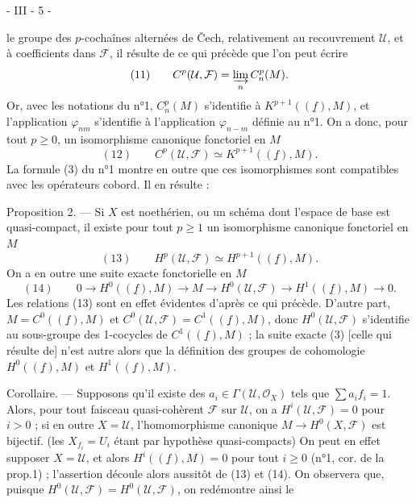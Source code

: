 \newpage


- III - 5 -

le groupe des $p$-cochaînes alternées de Čech, relativement au recouvrement $\mathcal{U}$, et à coefficients dans $\mathcal{F}$, il résulte de ce qui précède que l'on peut écrire
$$(11) \qquad C^p(\mathcal{U}, \mathcal{F}) = \varinjlim_n C_n^p(M) .$$
Or, avec les notations du n°1, $C_n^p(M)$ s'identifie à $K^{p+1}((\underline{f}), M)$, et l'application $\varphi_{nm}$ s'identifie à l'application $\varphi_{n-m}$ définie au n°1. On a donc, pour tout $p \ge 0$, un isomorphisme canonique fonctoriel en $M$
$$(12) \qquad C^p(\mathcal{U}, \mathcal{F}) \simeq K^{p+1}((\underline{f}), M) .$$
La formule (3) du n°1 montre en outre que ces isomorphismes sont compatibles avec les opérateurs cobord. Il en résulte :

Proposition 2. — Si $X$ est noethérien, ou un schéma dont l'espace de base est quasi-compact, il existe pour tout $p \ge 1$ un isomorphisme canonique fonctoriel en $M$
$$(13) \qquad H^p(\mathcal{U}, \mathcal{F}) \simeq H^{p+1}((\underline{f}), M) .$$
On a en outre une suite exacte fonctorielle en $M$
$$(14) \qquad 0 \to H^0((\underline{f}), M) \to M \to H^0(\mathcal{U}, \mathcal{F}) \to H^1((\underline{f}), M) \to 0 .$$
Les relations (13) sont en effet évidentes d'après ce qui précède. D'autre part, $M = C^0((\underline{f}), M)$ et $C^0(\mathcal{U}, \mathcal{F}) = C^1((\underline{f}), M)$, donc $H^0(\mathcal{U}, \mathcal{F})$ s'identifie au sous-groupe des 1-cocycles de $C^1((\underline{f}), M)$ ; la suite exacte (3) [celle qui résulte de] n'est autre alors que la définition des groupes de cohomologie $H^0((\underline{f}), M)$ et $H^1((\underline{f}), M)$.

Corollaire. — Supposons qu'il existe des $a_i \in \Gamma(\mathcal{U}, \mathcal{O}_X)$ tels que $\sum a_i f_i = 1$. Alors, pour tout faisceau quasi-cohèrent $\mathcal{F}$ sur $\mathcal{U}$, on a $H^i(\mathcal{U}, \mathcal{F}) = 0$ pour $i > 0$ ; si en outre $X=\mathcal{U}$, l'homomorphisme canonique $M \to H^0(X, \mathcal{F})$ est bijectif. (les $X_{f_i}=U_i$ étant par hypothèse quasi-compacts)
On peut en effet supposer $X=\mathcal{U}$, et alors $H^i((\underline{f}), M) = 0$ pour tout $i \ge 0$ (n°1, cor. de la prop.1) ; l'assertion découle alors aussitôt de (13) et (14). On observera que, puisque $H^0(\mathcal{U}, \mathcal{F}) = H^0(\mathcal{U}, \mathcal{F})$, on redémontre ainsi le

\newpage

